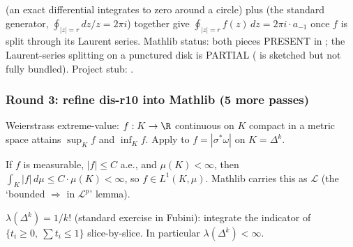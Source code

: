 \begin{lemma}
\label{lem:srt-r15}
 (an exact
differential integrates to zero around a circle) plus
 (the standard generator,
$\oint_{|z|=r} dz/z = 2\pi i$) together give
$\oint_{|z|=r} f(z)\,dz = 2\pi i \cdot a_{-1}$ once $f$ is split
through its Laurent series.  Mathlib status: both pieces PRESENT in
; the Laurent-series
splitting on a punctured disk is PARTIAL (
is sketched but not fully bundled).  Project stub:
.
\leanok
\end{lemma}

\subsubsection*{Round 3: refine dis-r10 into Mathlib (5 more passes)}

\begin{lemma}
\label{lem:dis-r11}
Weierstrass extreme-value: $f : K \to \R$ continuous on $K$ compact in a metric space attains $\sup_{K} f$ and $\inf_{K} f$.  Apply to $f = |\sigma^{*}\omega|$ on $K = \Delta^{k}$.
\leanok\mathlibok
\end{lemma}

\begin{lemma}
\label{lem:dis-r12}
If $f$ is measurable, $|f| \le C$ a.e., and $\mu(K) < \infty$, then $\int_{K} |f|\,d\mu \le C\cdot\mu(K) < \infty$, so $f \in L^{1}(K, \mu)$.  Mathlib carries this as $\mathcal{L}$ (the `bounded $\Rightarrow$ in $\mathcal{L}^p$' lemma).
\leanok\mathlibok
\end{lemma}

\begin{lemma}
\label{lem:dis-r13}
$\lambda(\Delta^{k}) = 1/k!$ (standard exercise in Fubini): integrate the indicator of $\{t_{i}\ge 0,\ \sum t_{i}\le 1\}$ slice-by-slice.  In particular $\lambda(\Delta^{k}) < \infty$.
\leanok
\end{lemma}

